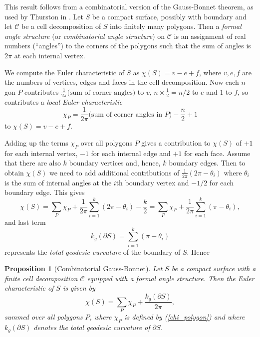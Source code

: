 \documentclass[12pt,reqno]{amsart}  %
\newtheorem{prop}[thm]{Proposition}
\theoremstyle{definition}
\theoremstyle{remark}
\def\be{  \begin{equation} }
\def\ee{  \end{equation} }
\def\bd{\partial}
\begin{document}
This result follows from a combinatorial version of the Gauss-Bonnet 
theorem, as used by Thurston in  \cite[Section 13.7]{Th}.
Let $S$ be a compact surface, possibly with boundary and let $\mathcal C$ 
be a cell decomposition of  $S$ into finitely many polygons.
Then a {\em formal angle structure} (or {\em combinatorial angle structure})
on $\mathcal C$ is an assignment of real numbers (``angles'')  to the 
corners of the polygons such that the sum of angles is $2\pi$ at each 
internal vertex.  

We compute the Euler characteristic of $S$ as 
$\chi(S) = v-e+f$, where $v,e,f$ are the numbers of vertices, edges and 
faces in the cell decomposition.
Now each $n$-gon $P$ contributes $\frac{1}{2\pi} 
\text{(sum of corner angles)}$ to $v$, 
$n \times \frac{1}{2}=n/2$ to $e$ and $1$ to $f$,
so contributes a {\em local Euler characteristic} 
\be
\label{chi_polygon}
\chi_P = \frac{1}{2\pi} \text{(sum of corner angles in $P$)} - \frac{n}{2}+1
\ee
to $\chi(S) = v-e+f$.

Adding up the terms $\chi_P$ over all polygons $P$ gives a contribution to 
$\chi(S)$ of $+1$ for each internal vertex, $-1$ for each internal edge
and $+1$ for each face.   Assume that there are also $k$ boundary vertices 
and, hence, $k$ boundary edges. Then to obtain $\chi(S)$ we need to add 
additional contributions of $\frac{1}{2\pi}(2\pi-\theta_i)$ where 
$\theta_i$ is the sum of internal angles at the $i$th boundary vertex 
and $-1/2$ for each boundary edge. This  gives
$$
\chi(S)= \sum_P \chi_P +  \frac{1}{2\pi} 
\sum_{i=1}^k (2\pi-\theta_i) - \frac{k}{2} =  \sum_P \chi_P + \frac{1}{2\pi} 
\sum_{i=1}^k (\pi-\theta_i),
$$
and last term 
\be 
\label{geod_curb_bd} 
k_g(\bd S) = \sum_{i=1}^k (\pi-\theta_i)
\ee
represents the {\em total geodesic curvature} of the boundary of $S$. Hence

\begin{prop}[Combinatorial Gauss-Bonnet]
\label{comb_Gauss-Bonnet}
Let $S$ be a compact surface with a finite cell decomposition 
$\mathcal C$ equipped with a formal angle structure. 
Then the Euler characteristic of $S$ is given by
\be
\chi(S) = \sum_P \chi_P + \frac{k_g(\bd S)}{2\pi},
\ee
summed over all polygons $P$, where $\chi_P$ is defined by 
(\ref{chi_polygon}) and where $k_g(\bd S)$ denotes the total geodesic 
curvature of $\bd S$. 
\end{prop}
\end{document}
